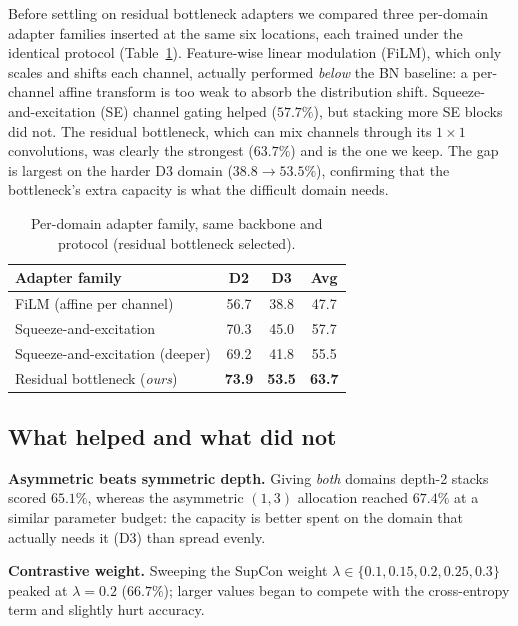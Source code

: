 \documentclass{article}
\begin{document}
\begin{sloppy}
Before settling on residual bottleneck adapters we compared three per-domain
adapter families inserted at the same six locations, each trained under the
identical protocol (Table~\ref{tab:adapter}). Feature-wise linear modulation
(FiLM), which only scales and shifts each channel, actually performed
\emph{below} the BN baseline: a per-channel affine transform is too weak to
absorb the distribution shift. Squeeze-and-excitation (SE) channel gating
helped ($57.7\%$), but stacking more SE blocks did not. The residual
bottleneck, which can mix channels through its $1\times1$ convolutions, was
clearly the strongest ($63.7\%$) and is the one we keep. The gap is largest
on the harder D3 domain ($38.8\rightarrow53.5\%$), confirming that the
bottleneck's extra capacity is what the difficult domain needs.

\begin{table}[t]
  \centering
  \caption{Per-domain adapter family, same backbone and protocol
           (residual bottleneck selected).}
  \label{tab:adapter}
  \begin{tabularx}{\columnwidth}{Xccc}
    \toprule
    Adapter family & D2 & D3 & Avg \\
    \midrule
    FiLM (affine per channel)        & 56.7 & 38.8 & 47.7 \\
    Squeeze-and-excitation           & 70.3 & 45.0 & 57.7 \\
    Squeeze-and-excitation (deeper)  & 69.2 & 41.8 & 55.5 \\
    Residual bottleneck (\emph{ours}) & \textbf{73.9} & \textbf{53.5} & \textbf{63.7} \\
    \bottomrule
  \end{tabularx}
\end{table}

\subsection{What helped and what did not}
\label{ssec:choices}

\noindent\textbf{Asymmetric beats symmetric depth.} Giving \emph{both} domains
depth-2 stacks scored $65.1\%$, whereas the asymmetric $(1,3)$ allocation
reached $67.4\%$ at a similar parameter budget: the capacity is better spent
on the domain that actually needs it (D3) than spread evenly.

\noindent\textbf{Contrastive weight.} Sweeping the SupCon weight $\lambda \in
\{0.1,0.15,0.2,0.25,0.3\}$ peaked at $\lambda=0.2$ ($66.7\%$); larger values
began to compete with the cross-entropy term and slightly hurt accuracy.


\end{sloppy}
\end{document}
